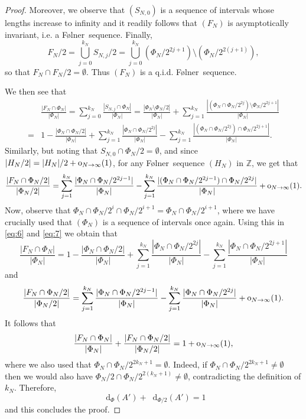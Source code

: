 \documentclass[reqno]{amsart}
\def\Z{{\mathbb Z}}
\newcommand*\diff{\mathop{}\!\mathrm{d}}
\theoremstyle{definition}
\theoremstyle{remark}
\theoremstyle{remark}
\newcommand{\Folner}{F\o{}lner}
\newcommand{\oh}{{\rm o}}
\begin{document}
\begin{proof}
Moreover, we observe that $(S_{N,0})$ is a sequence of 
intervals whose lengths increase to infinity and it readily
follows that $(F_N)$ is asymptotically invariant, i.e. a \Folner\ sequence. Finally, 
$$F_N/2=\bigcup_{j=0}^{k_N} S_{N,j}/2=\bigcup_{j=0}^{k_N} (\Phi_N/2^{2j+1})\setminus (\Phi_N/2^{2(j+1)}),$$
so that $F_N\cap F_N/2=\emptyset$. Thus $(F_N)$ is a q.i.d. \Folner\ sequence.  

We then see that 
\begin{align}\label{eq:6} 
& \frac{|F_N\cap \Phi_N|}{|\Phi_N|}=\sum_{j=0}^{k_N} \frac{|S_{N,j}\cap \Phi_N|}{|\Phi_N|}= \frac{|\Phi_N\setminus \Phi_N/2|}{|\Phi_N|} + \sum_{j=1}^{k_N} \frac{|(\Phi_N \cap \Phi_N/2^{2j})\setminus \Phi_N/2^{2j+1} |}{|\Phi_N|}\nonumber \\
=& 1 - \frac{|\Phi_N\cap \Phi_N/2|}{|\Phi_N|} + \sum_{j=1}^{k_N} \frac{|\Phi_N \cap \Phi_N/2^{2j} |}{|\Phi_N|} - \sum_{j=1}^{k_N} \frac{|(\Phi_N \cap \Phi_N/2^{2j}) \cap \Phi_N/2^{2j+1} |}{|\Phi_N|}.
\end{align}
Similarly, but noting that $S_{N,0}\cap \Phi_N/2=\emptyset$, 
and since $|H_N/2|=|H_N|/2+\oh_{N\to\infty}(1)$, for any \Folner\ sequence $(H_N)$ in $\Z$, we get
that 
\begin{equation}\label{eq:7}
\frac{|F_N\cap \Phi_N/2|}{|\Phi_N/2|}=\sum_{j=1}^{k_N} \frac{|\Phi_N \cap \Phi_N/2^{2j-1} |}{|\Phi_N|} - \sum_{j=1}^{k_N} \frac{|(\Phi_N \cap \Phi_N/2^{2j-1} ) \cap \Phi_N/2^{2j} |}{|\Phi_N|}+\oh_{N\to\infty}(1). 
\end{equation}
Now, observe that $\Phi_N \cap \Phi_N/2^i \cap \Phi_N/2^{i+1} = \Phi_N \cap \Phi_N/2^{i+1}$, where we have crucially used that $(\Phi_N)$ is a sequence of intervals once again. Using this in \eqref{eq:6} and \eqref{eq:7} we obtain that 
\begin{equation}\label{eq:8}
\frac{|F_N\cap \Phi_N|}{|\Phi_N|} = 1 - \frac{|\Phi_N\cap \Phi_N/2|}{|\Phi_N|} + \sum_{j=1}^{k_N} \frac{|\Phi_N \cap \Phi_N/2^{2j} |}{|\Phi_N|} - \sum_{j=1}^{k_N} \frac{|\Phi_N \cap \Phi_N/2^{2j+1} |}{|\Phi_N|}
\end{equation}
and 
\begin{equation}\label{eq:9}
\frac{|F_N\cap \Phi_N/2|}{|\Phi_N/2|} = \sum_{j=1}^{k_N} \frac{|\Phi_N \cap \Phi_N/2^{2j-1} |}{|\Phi_N|} - \sum_{j=1}^{k_N} \frac{|\Phi_N \cap \Phi_N/2^{2j} |}{|\Phi_N|}+\oh_{N\to\infty}(1). 
\end{equation}
It follows that 
$$\frac{|F_N\cap \Phi_N|}{|\Phi_N|} + \frac{|F_N\cap \Phi_N/2|}{|\Phi_N/2|}= 1+\oh_{N\to\infty}(1),$$
where we also used that $\Phi_N \cap \Phi_N/2^{2k_N+1} = \emptyset$. Indeed, if $\Phi_N \cap \Phi_N/2^{2k_N+1} \neq \emptyset$ then we would also have $\Phi_N/2 \cap \Phi_N/2^{2(k_N+1)} \neq \emptyset$, contradicting the definition of $k_N$. Therefore, 
\begin{equation*}
\diff_{\Phi}(A')+ \diff_{\Phi/2}(A') = 1
\end{equation*}
and this concludes the proof.
\end{proof}
\end{document}
